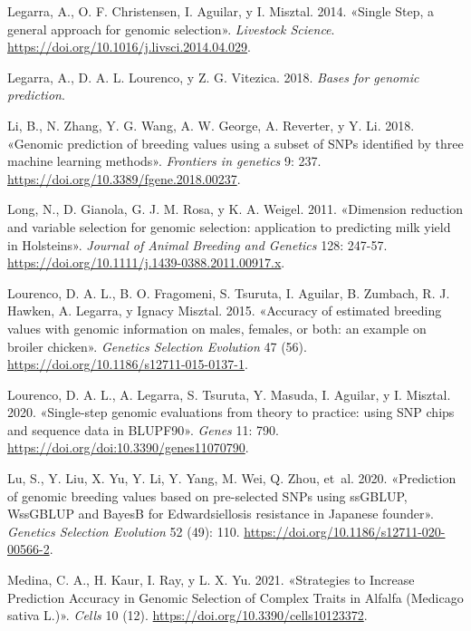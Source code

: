 \documentclass[11pt,spanish,a4paper,oneside,]{book} %
\begin{document}
\leavevmode\hypertarget{ref-cite:15}{}%
Legarra, A., O. F. Christensen, I. Aguilar, y I. Misztal. 2014. «Single Step, a general approach for genomic selection». \emph{Livestock Science}. \url{https://doi.org/10.1016/j.livsci.2014.04.029}.

\leavevmode\hypertarget{ref-cite:30}{}%
Legarra, A., D. A. L. Lourenco, y Z. G. Vitezica. 2018. \emph{Bases for genomic prediction}.

\leavevmode\hypertarget{ref-cite:85}{}%
Li, B., N. Zhang, Y. G. Wang, A. W. George, A. Reverter, y Y. Li. 2018. «Genomic prediction of breeding values using a subset of SNPs identified by three machine learning methods». \emph{Frontiers in genetics} 9: 237. \url{https://doi.org/10.3389/fgene.2018.00237}.

\leavevmode\hypertarget{ref-cite:86}{}%
Long, N., D. Gianola, G. J. M. Rosa, y K. A. Weigel. 2011. «Dimension reduction and variable selection for genomic selection: application to predicting milk yield in Holsteins». \emph{Journal of Animal Breeding and Genetics} 128: 247-57. \url{https://doi.org/10.1111/j.1439-0388.2011.00917.x}.

\leavevmode\hypertarget{ref-cite:87}{}%
Lourenco, D. A. L., B. O. Fragomeni, S. Tsuruta, I. Aguilar, B. Zumbach, R. J. Hawken, A. Legarra, y Ignacy Misztal. 2015. «Accuracy of estimated breeding values with genomic information on males, females, or both: an example on broiler chicken». \emph{Genetics Selection Evolution} 47 (56). \url{https://doi.org/10.1186/s12711-015-0137-1}.

\leavevmode\hypertarget{ref-cite:22}{}%
Lourenco, D. A. L., A. Legarra, S. Tsuruta, Y. Masuda, I. Aguilar, y I. Misztal. 2020. «Single-step genomic evaluations from theory to practice: using SNP chips and sequence data in BLUPF90». \emph{Genes} 11: 790. \url{https://doi.org/doi:10.3390/genes11070790}.

\leavevmode\hypertarget{ref-cite:80}{}%
Lu, S., Y. Liu, X. Yu, Y. Li, Y. Yang, M. Wei, Q. Zhou, et~al. 2020. «Prediction of genomic breeding values based on pre-selected SNPs using ssGBLUP, WssGBLUP and BayesB for Edwardsiellosis resistance in Japanese founder». \emph{Genetics Selection Evolution} 52 (49): 110. \url{https://doi.org/10.1186/s12711-020-00566-2}.

\leavevmode\hypertarget{ref-cite:38}{}%
Medina, C. A., H. Kaur, I. Ray, y L. X. Yu. 2021. «Strategies to Increase Prediction Accuracy in Genomic Selection of Complex Traits in Alfalfa (Medicago sativa L.)». \emph{Cells} 10 (12). \url{https://doi.org/10.3390/cells10123372}.
\end{document}
